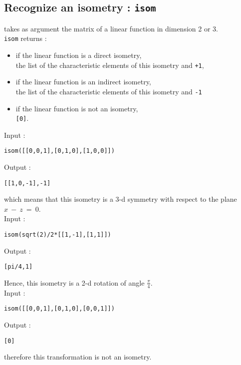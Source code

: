 \documentclass[a4paper,11pt]{book}
\begin{document}
\subsection{Recognize an isometry : {\tt isom}}
 takes as argument the matrix of a linear
function in dimension 2 or 3.\\
{\tt isom} returns :
\begin{itemize}
\item  
if the linear function is a direct isometry,\\
the list of the characteristic elements of this isometry and {\tt +1},
\item if the linear function is an indirect isometry,\\
the list of the characteristic elements of this isometry and {\tt -1} 
\item if the linear function is not an isometry,\\
{\tt [0]}.
\end{itemize}
Input :
\begin{center}{\tt isom([[0,0,1],[0,1,0],[1,0,0]])}\end{center}
Output :
\begin{center}{\tt  [[1,0,-1],-1]}\end{center}
which means that this isometry is a 3-d symmetry with respect to the plane 
$x\ -\ z\ =\ 0$.\\ 
Input :
\begin{center}{\tt isom(sqrt(2)/2*[[1,-1],[1,1]])}\end{center}
Output :
\begin{center}{\tt [pi/4,1]}\end{center}
Hence, this isometry is a 2-d rotation of angle 
$\displaystyle \frac{\pi}{4}$.\\
Input :
\begin{center}{\tt isom([[0,0,1],[0,1,0],[0,0,1]])}\end{center}
Output :
\begin{center}{\tt [0]}\end{center}
therefore this transformation is not an isometry.
\end{document}
